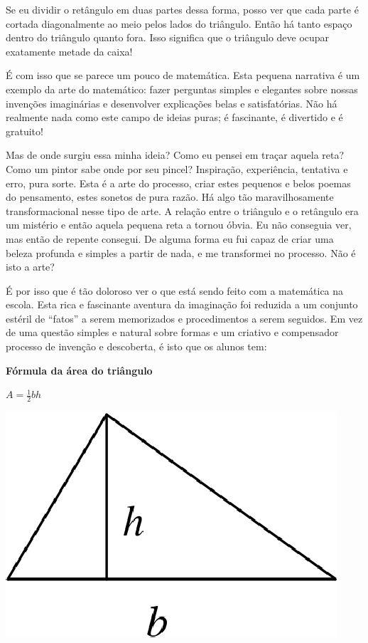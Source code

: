 \documentclass[a4paper,oneside,12pt,notitlepage]{article}
\begin{document}
Se eu dividir o retângulo em duas partes dessa forma, posso ver que cada parte é cortada diagonalmente ao meio pelos lados do triângulo.
Então há tanto espaço dentro do triângulo quanto fora.
Isso significa que o triângulo deve ocupar exatamente metade da caixa!

É com isso que se parece um pouco de matemática. %
Esta pequena narrativa é um exemplo da arte do matemático: fazer perguntas simples e elegantes sobre nossas invenções imaginárias e desenvolver explicações belas e satisfatórias.
Não há realmente nada como este campo de ideias puras; é fascinante, é divertido e é gratuito! %

Mas de onde surgiu essa minha ideia?
Como eu pensei em traçar aquela reta?
Como um pintor sabe onde por seu pincel?
Inspiração, experiência, tentativa e erro, pura sorte.
Esta é a arte do processo, criar estes pequenos e belos poemas do pensamento, estes sonetos de pura razão. %
Há algo tão maravilhosamente transformacional nesse tipo de arte.
A relação entre o triângulo e o retângulo era um mistério e então aquela pequena reta a tornou óbvia.
Eu não conseguia ver, mas então de repente consegui.
De alguma forma eu fui capaz de criar uma beleza profunda e simples a partir de nada, e me transformei no processo.
Não é isto a arte? %

É por isso que é tão doloroso ver o que está sendo feito com a matemática na escola.
Esta rica e fascinante aventura da imaginação foi reduzida a um conjunto estéril de ``fatos'' a serem memorizados e procedimentos a serem seguidos.
Em vez de uma questão simples e natural sobre formas e um criativo e compensador processo de invenção e descoberta, é isto que os alunos tem:

\vspace{1em}

\begin{minipage}[c]{0.45\linewidth}
	\centering
	\textbf{Fórmula da área do triângulo}

	$A=\frac12 b h$
\end{minipage}
\hspace{0.5em}
\begin{minipage}[c]{0.45\linewidth}
	\centering
	\includegraphics{triangle2.eps}
\end{minipage}
\end{document}
